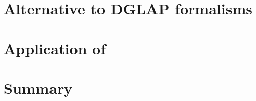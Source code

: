 \section{Alternative to DGLAP formalisms}
\label{sec:alternative}

\section{Application of \fitter}
\label{sec:examples}



\section{Summary}
\label{sec:outlook}





%
%

